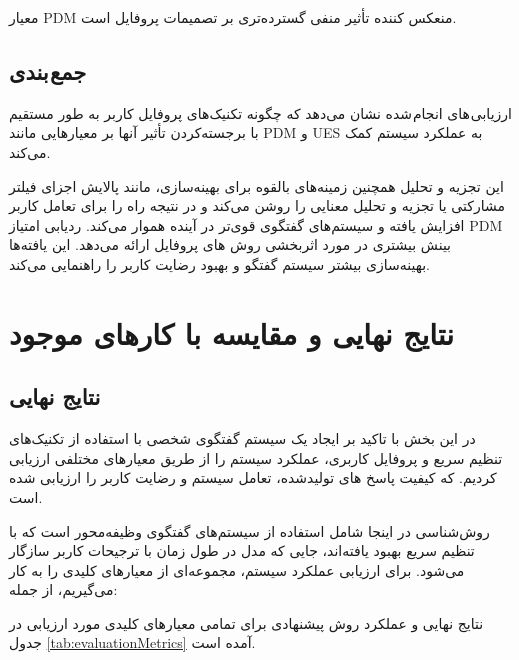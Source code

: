 معیار PDM منعکس کننده تأثیر منفی گسترده‌تری بر تصمیمات پروفایل است.




\subsection{جمع بندی}
ارزیابی های انجام شده نشان می‌دهد که چگونه تکنیک‌های پروفایل کاربر به طور مستقیم با برجسته‌کردن تأثیر آنها بر معیارهایی مانند PDM و UES به عملکرد سیستم کمک می‌کند. 

این تجزیه و تحلیل همچنین زمینه‌های بالقوه برای بهینه‌سازی، مانند پالایش اجزای فیلتر مشارکتی یا تجزیه و تحلیل معنایی را روشن می‌کند و در نتیجه راه را برای تعامل کاربر افزایش‌ یافته و سیستم‌های گفتگوی قوی‌تر در آینده هموار می‌کند. ردیابی امتیاز PDM بینش بیشتری در مورد اثربخشی روش های پروفایل ارائه می‌دهد. این یافته‌ها بهینه‌سازی بیشتر سیستم گفتگو و بهبود رضایت کاربر را راهنمایی می‌کند.

\section{نتایج نهایی و مقایسه با کارهای موجود}

\subsection{نتایج نهایی}
در این بخش با تاکید بر ایجاد یک سیستم گفتگوی شخصی با استفاده از تکنیک‌های تنظیم سریع و پروفایل کاربری، عملکرد سیستم را از طریق معیارهای مختلفی ارزیابی کردیم. که کیفیت پاسخ های تولید‌شده، تعامل سیستم و رضایت کاربر را ارزیابی شده است. 

روش‌شناسی در اینجا شامل استفاده از سیستم‌های گفتگوی وظیفه‌محور است که با تنظیم سریع بهبود یافته‌اند، جایی که مدل در طول زمان با ترجیحات کاربر سازگار می‌شود. برای ارزیابی عملکرد سیستم، مجموعه‌ای از معیارهای کلیدی را به کار می‌گیریم، از جمله:

نتایج نهایی و عملکرد روش پیشنهادی برای تمامی معیارهای کلیدی مورد ارزیابی در جدول%
\ref{tab:evaluationMetrics}
آمده است.

